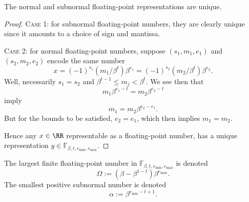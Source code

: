 \begin{thm}
The normal and subnormal floating-point representations are unique.
\end{thm}
\begin{proof}
\textsc{Case 1:} for subnormal floating-point numbers, they are clearly
unique since it amounts to a choice of sign and mantissa.

\textsc{Case 2:} for normal floating-point numbers, suppose
$(s_{1},m_{1},e_{1})$ and $(s_{2},m_{2},e_{2})$ encode the same number
\begin{equation}
  x = (-1)^{s_{1}}(m_{1}/\beta^{t})\beta^{e_{1}} = (-1)^{s_{2}}(m_{2}/\beta^{t})\beta^{e_{2}}.
\end{equation}
Well, necessarily $s_{1}=s_{2}$ and $\beta^{t-1}\leq m_{j} < \beta^{t}$.
We see then that
\begin{equation}
  m_{1}\beta^{e_{1}-t} = m_{2}\beta^{e_{2}-t}
\end{equation}
imply
\begin{equation}
  m_{1} = m_{2}\beta^{e_{2}-e_{1}}.
\end{equation}
But for the bounds to be satisfied, $e_{2}=e_{1}$, which then implies
$m_{1}=m_{2}$.

Hence any $x\in\RR$ representable as a floating-point number, has a unique
representation $y\in\mathbb{F}_{\beta,t,e_{\text{min}},e_{\text{max}}}$.
\end{proof}


\begin{defn}
  The largest finite floating-point number in $\mathbb{F}_{\beta,t,e_{\text{min}},e_{\text{max}}}$
  is denoted\index{$\Omega$}
  \begin{equation}
    \Omega := (\beta - \beta^{1-t})\beta^{e_{\text{max}}}.
  \end{equation}
  The smallest positive subnormal number is denoted\index{$\alpha$}
  \begin{equation}
    \alpha := \beta^{e_{\text{min}}-t+1}.
  \end{equation}
\end{defn}











